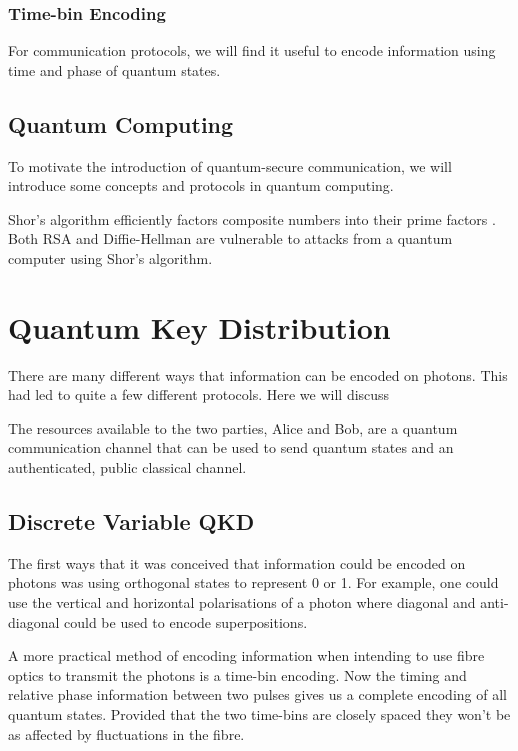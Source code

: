 \subsubsection{Time-bin Encoding}

For communication protocols, we will find it useful to encode information using time and phase of quantum states.

\subsection{Quantum Computing}

To motivate the introduction of quantum-secure communication, we will introduce some concepts and protocols in quantum computing. 

Shor's algorithm efficiently factors composite numbers into their prime factors \cite{shor1994}. Both RSA and Diffie-Hellman are vulnerable to attacks from a quantum computer using Shor's algorithm.


\section{Quantum Key Distribution}

There are many different ways that information can be encoded on photons. This had led to quite a few different protocols. Here we will discuss 

The resources available to the two parties, Alice and Bob, are a quantum communication channel that can be used to send quantum states and an authenticated, public classical channel. 

\subsection{Discrete Variable QKD}

The first ways that it was conceived that information could be encoded on photons was using orthogonal states to represent 0 or 1. For example, one could use the vertical and horizontal polarisations of a photon where diagonal and anti-diagonal could be used to encode superpositions. 

A more practical method of encoding information when intending to use fibre optics to transmit the photons is a time-bin encoding. Now the timing and relative phase information between two pulses gives us a complete encoding of all quantum states. Provided that the two time-bins are closely spaced they won't be as affected by fluctuations in the fibre.

